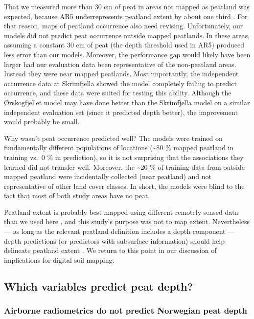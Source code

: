 \documentclass[soil, manuscript]{copernicus}
\begin{document}
That we measured more than 30 cm of peat in areas not mapped as peatland was expected, because AR5 underrepresents peatland extent by about one third \citep{brynLandCoverNorway2018}.
For that reason, maps of peatland occurrence also need revising.
Unfortunately, our models did not predict peat occurrence outside mapped peatlands.
In these areas, assuming a constant 30 cm of peat (the depth threshold used in AR5) produced less error than our models.
Moreover, the performance gap would likely have been larger had our evaluation data been representative of the non-peatland areas.
Instead they were near mapped peatlands.
Most importantly, the independent occurrence data at Skrimfjella showed the model completely failing to predict occurrence, and these data were suited for testing this ability.
Although the Ørskogfjellet model may have done better than the Skrimfjella model on a similar independent evaluation set (since it predicted depth better), the improvement would probably be small.

Why wasn't peat occurrence predicted well?
The models were trained on fundamentally different populations of locations (\textasciitilde80 \% mapped peatland in training vs.~0 \% in prediction), so it is not surprising that the associations they learned did not transfer well.
Moreover, the \textasciitilde20 \% of training data from outside mapped peatland were incidentally collected (near peatland) and not representative of other land cover classes.
In short, the models were blind to the fact that most of both study areas have no peat.

Peatland extent is probably best mapped using different remotely sensed data than we used here \citep{bakkestuenDelineationWetlandAreas2023}, and this study's purpose was not to map extent.
Nevertheless --- as long as the relevant peatland definition includes a depth component --- depth predictions (or predictors with subsurface information) should help delineate peatland extent \citep{olearyDigitalSoilMapping2022, beamishDetailedMappingPeat2024}.
We return to this point in our discussion of implications for digital soil mapping.

\subsection{Which variables predict peat depth?}

\subsubsection{Airborne radiometrics do not predict Norwegian peat depth}
\end{document}
